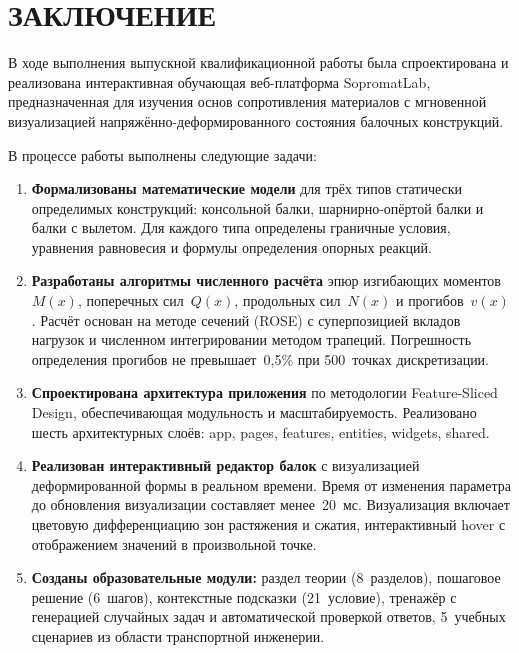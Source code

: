 ﻿%
\section*{ЗАКЛЮЧЕНИЕ}

В ходе выполнения выпускной квалификационной работы была спроектирована и реализована интерактивная обучающая веб-платформа SopromatLab, предназначенная для изучения основ сопротивления материалов с мгновенной визуализацией напряжённо-деформированного состояния балочных конструкций.

В процессе работы выполнены следующие задачи:

\begin{enumerate}
  \item \textbf{Формализованы математические модели} для трёх типов статически определимых конструкций: консольной балки, шарнирно-опёртой балки и балки с вылетом. Для каждого типа определены граничные условия, уравнения равновесия и формулы определения опорных реакций.

  \item \textbf{Разработаны алгоритмы численного расчёта} эпюр изгибающих моментов~$M(x)$, поперечных сил~$Q(x)$, продольных сил~$N(x)$ и прогибов~$v(x)$. Расчёт основан на методе сечений (ROSE) с суперпозицией вкладов нагрузок и численном интегрировании методом трапеций. Погрешность определения прогибов не превышает~0{,}5\% при 500~точках дискретизации.


  \item \textbf{Спроектирована архитектура приложения} по методологии Feature-Sliced Design, обеспечивающая модульность и масштабируемость. Реализовано шесть архитектурных слоёв: app, pages, features, entities, widgets, shared.

  \item \textbf{Реализован интерактивный редактор балок} с визуализацией деформированной формы в реальном времени. Время от изменения параметра до обновления визуализации составляет менее~20~мс. Визуализация включает цветовую дифференциацию зон растяжения и сжатия, интерактивный hover с отображением значений в произвольной точке.

  \item \textbf{Созданы образовательные модули:} раздел теории (8~разделов), пошаговое решение (6~шагов), контекстные подсказки (21~условие), тренажёр с генерацией случайных задач и автоматической проверкой ответов, 5~учебных сценариев из области транспортной инженерии.


\end{enumerate}
